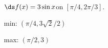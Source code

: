 {$\ds f(x) = 3\sin x$\quad  on \quad $[\pi/4,2\pi/3]$.
}
{min: $(\pi/4,3\sqrt{2}/2)$

max: $(\pi/2,3)$
}
